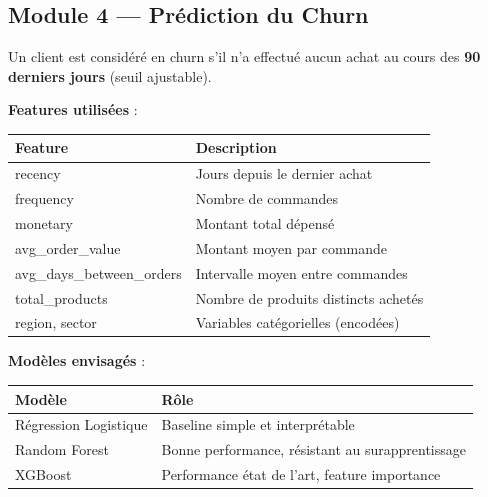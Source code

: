 \documentclass[11pt,a4paper]{article}
\begin{document}
\subsection{Module 4 --- Prédiction du Churn}

\begin{infobox}
Un client est considéré en churn s'il n'a effectué aucun achat au cours des \textbf{90 derniers jours} (seuil ajustable).
\end{infobox}

\textbf{Features utilisées} :

\begin{center}
\small
\begin{tabular}{>{\ttfamily\small}p{5.5cm} p{8cm}}
\toprule
\rowcolor{primary}
\color{white}\bfseries Feature & \color{white}\bfseries Description \\
\midrule
recency                 & Jours depuis le dernier achat \\
\rowcolor{lightbg}
frequency               & Nombre de commandes \\
monetary                & Montant total dépensé \\
\rowcolor{lightbg}
avg\_order\_value         & Montant moyen par commande \\
avg\_days\_between\_orders & Intervalle moyen entre commandes \\
\rowcolor{lightbg}
total\_products           & Nombre de produits distincts achetés \\
region, sector          & Variables catégorielles (encodées) \\
\bottomrule
\end{tabular}
\end{center}

\textbf{Modèles envisagés} :

\begin{center}
\small
\begin{tabular}{p{4.5cm} p{9cm}}
\toprule
\rowcolor{primary}
\color{white}\bfseries Modèle & \color{white}\bfseries Rôle \\
\midrule
Régression Logistique & Baseline simple et interprétable \\
\rowcolor{lightbg}
Random Forest         & Bonne performance, résistant au surapprentissage \\
XGBoost               & Performance état de l'art, feature importance \\
\bottomrule
\end{tabular}
\end{center}
\end{document}
